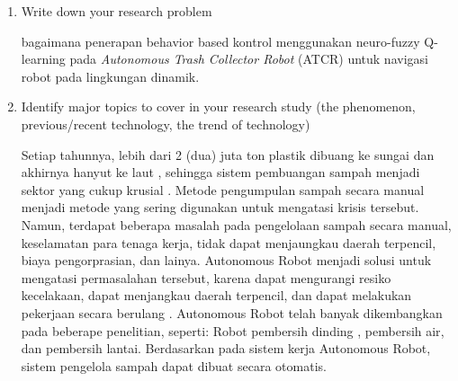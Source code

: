  \begin{enumerate}
 	\item Write down your research problem
 	
 	bagaimana penerapan behavior based kontrol menggunakan neuro-fuzzy Q-learning pada \textit{Autonomous Trash Collector Robot} (ATCR)  untuk  navigasi  robot  pada lingkungan dinamik.
 	
 	\item Identify major topics to cover in your research study (the phenomenon, previous/recent technology, the trend of technology)
 	
 	Setiap tahunnya, lebih dari 2 (dua) juta ton plastik dibuang ke sungai dan akhirnya hanyut ke laut \cite{Othman2020}, sehingga sistem pembuangan sampah menjadi sektor yang cukup krusial \cite{Othman2020}\cite{Hossain2019}. Metode pengumpulan sampah secara manual menjadi metode yang sering digunakan untuk mengatasi krisis tersebut\cite{Khan2020}. Namun, terdapat beberapa masalah pada pengelolaan sampah secara manual, keselamatan para tenaga kerja, tidak dapat menjaungkau daerah terpencil, biaya pengorprasian, dan lainya\cite{Khan2020}. Autonomous Robot menjadi solusi untuk mengatasi permasalahan tersebut, karena dapat mengurangi resiko kecelakaan, dapat menjangkau daerah terpencil, dan dapat melakukan pekerjaan secara berulang \cite{Khan2020}\cite{Bai2018}. Autonomous Robot telah banyak dikembangkan pada beberape penelitian, seperti: Robot pembersih dinding \cite{HouxiangZhang2006}, pembersih air\cite{Yuan2011}, dan pembersih lantai\cite{Bai2018}\cite{Kang2014}\cite{Palacin2004}. Berdasarkan pada sistem kerja Autonomous Robot, sistem pengelola sampah dapat dibuat secara otomatis\cite{Bai2018}\cite{Nagayo2019}\cite{Prasetyo2020}.
 	

\end{enumerate}
